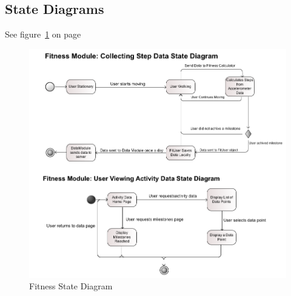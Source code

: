 \subsection{State Diagrams}
See figure~\ref{fig:fitness_state_diagram} on page~\pageref{fig:fitness_state_diagram}
\begin{figure}
	\centering
	\includegraphics[scale=0.54]{Fitness/fitness_state_diagram.png}
	\caption{Fitness State Diagram}
	\label{fig:fitness_state_diagram}
\end{figure}